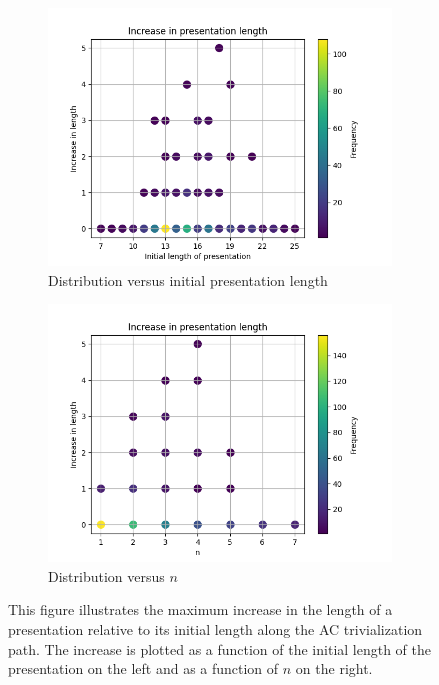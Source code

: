 \begin{figure}
	\centering
	\begin{subfigure}[b]{0.5\textwidth}
		\includegraphics[width=\textwidth]{fig/gs_length_increase_vs_length.png}
		\caption{Distribution versus initial presentation length}
		\label{fig:gs_length_increase_vs_length}
	\end{subfigure}%
	\begin{subfigure}[b]{0.5\textwidth}
		\centering
		\includegraphics[width=1.1\textwidth]{fig/gs_length_increase_vs_n.png}
		\caption{Distribution versus $n$}
		\label{fig:gs_length_increase_vs_n}
	\end{subfigure}
	\caption{
This figure illustrates the maximum increase in the length of a presentation relative to its initial length along the AC trivialization path. The increase is plotted as a function of the initial length of the presentation on the left and as a function of $n$ on the right.} \label{fig:gs_length_increase}
\end{figure}


